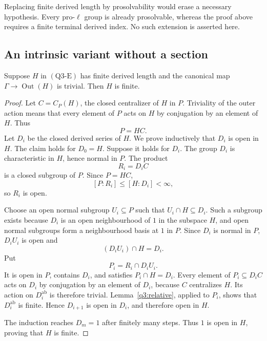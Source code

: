 \begin{remark}
Replacing finite derived length by prosolvability would erase a
necessary hypothesis.  Every pro-\(\ell\) group is already
prosolvable, whereas the proof above requires a finite terminal
derived index.  No such extension is asserted here.
\end{remark}

\subsection{An intrinsic variant without a section}

\begin{proposition}
\label{q3:outer}
Suppose \(H\) in \((\mathrm{Q3\text{-}E})\) has finite derived
length and the canonical map
\(\Gamma\to\operatorname{Out}(H)\) is trivial.  Then \(H\) is finite.
\end{proposition}

\begin{proof}
Let \(C=C_P(H)\), the closed centralizer of \(H\) in \(P\).
Triviality of the outer action means that every element of \(P\)
acts on \(H\) by conjugation by an element of \(H\).  Thus
\[
P=HC.
\]
Let \(D_i\) be the closed derived series of \(H\).  We prove
inductively that \(D_i\) is open in \(H\).  The claim holds for
\(D_0=H\).  Suppose it holds for \(D_i\).  The group \(D_i\) is
characteristic in \(H\), hence normal in \(P\).  The product
\[
R_i=D_i C
\]
is a closed subgroup of \(P\).  Since \(P=HC\),
\[
[P:R_i]\le[H:D_i]<\infty,
\]
so \(R_i\) is open.

Choose an open normal subgroup \(U_i\subseteq P\) such that
\(U_i\cap H\subseteq D_i\).  Such a subgroup exists because \(D_i\)
is an open neighbourhood of \(1\) in the subspace \(H\), and open
normal subgroups form a neighbourhood basis at \(1\) in \(P\).
Since \(D_i\) is normal in \(P\), \(D_iU_i\) is open and
\[
(D_iU_i)\cap H=D_i.
\]
Put
\[
P_i=R_i\cap D_iU_i.
\]
It is open in \(P\), contains \(D_i\), and satisfies
\(P_i\cap H=D_i\).  Every element of \(P_i\subseteq D_iC\) acts on
\(D_i\) by conjugation by an element of \(D_i\), because \(C\)
centralizes \(H\).  Its action on \(D_i^{\mathrm{ab}}\) is
therefore trivial.  Lemma~\ref{q3:relative}, applied to \(P_i\),
shows that \(D_i^{\mathrm{ab}}\) is finite.  Hence \(D_{i+1}\)
is open in \(D_i\), and therefore open in \(H\).

The induction reaches \(D_m=1\) after finitely many steps.  Thus
\(1\) is open in \(H\), proving that \(H\) is finite.
\end{proof}

